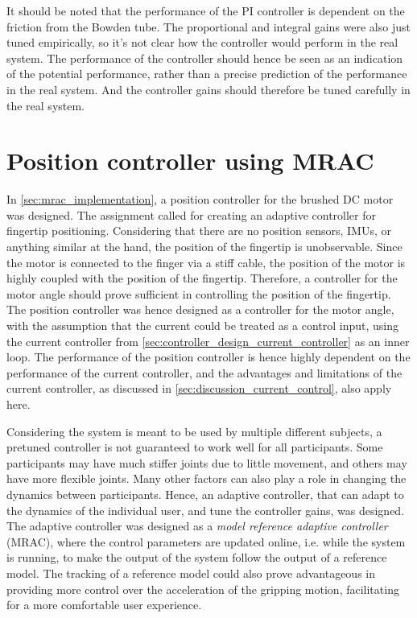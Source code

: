 It should be noted that the performance of the PI controller is dependent on the friction from the Bowden tube. The proportional and integral gains were also just tuned empirically, so it's not clear how the controller would perform in the real system. The performance of the controller should hence be seen as an indication of the potential performance, rather than a precise prediction of the performance in the real system. And the controller gains should therefore be tuned carefully in the real system.

\section{Position controller using MRAC}%
\label{sec:discussion_adaptive_position_control}

In \cref{sec:mrac_implementation}, a position controller for the brushed DC motor was designed. The assignment called for creating an adaptive controller for fingertip positioning. Considering that there are no position sensors, IMUs, or anything similar at the hand, the position of the fingertip is unobservable. Since the motor is connected to the finger via a stiff cable, the position of the motor is highly coupled with the position of the fingertip. Therefore, a controller for the motor angle should prove sufficient in controlling the position of the fingertip. The position controller was hence designed as a controller for the motor angle, with the assumption that the current could be treated as a control input, using the current controller from \cref{sec:controller_design_current_controller} as an inner loop. The performance of the position controller is hence highly dependent on the performance of the current controller, and the advantages and limitations of the current controller, as discussed in \cref{sec:discussion_current_control}, also apply here. 

Considering the system is meant to be used by multiple different subjects, a pretuned controller is not guaranteed to work well for all participants. Some participants may have much stiffer joints due to little movement, and others may have more flexible joints. Many other factors can also play a role in changing the dynamics between participants. Hence, an adaptive controller, that can adapt to the dynamics of the individual user, and tune the controller gains, was designed. The adaptive controller was designed as a \textit{model reference adaptive controller} (MRAC), where the control parameters are updated online, i.e. while the system is running, to make the output of the system follow the output of a reference model. The tracking of a reference model could also prove advantageous in providing more control over the acceleration of the gripping motion, facilitating for a more comfortable user experience.

